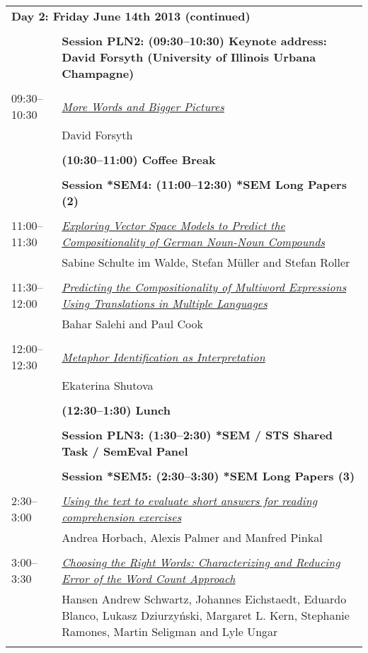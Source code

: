 \begin{tabular}{p{20mm}p{138mm}}
\\
\multicolumn{2}{l}{\bf Day 2: Friday June 14th 2013 (continued)} \\\\
 & {\bf Session PLN2: (09:30--10:30) Keynote address: David Forsyth (University of Illinois Urbana Champagne)} \\
\\
09:30--10:30 & \hyperlink{page.254}{\em More Words and Bigger Pictures}\\
         & David Forsyth \\
\\

 & {\bf (10:30--11:00) Coffee Break} \\
\\
 & {\bf Session *SEM4: (11:00--12:30) *SEM Long Papers (2)} \\
\\
11:00--11:30 & \hyperlink{page.255}{\em Exploring Vector Space Models to Predict the Compositionality of German Noun-Noun Compounds}\\
         & Sabine Schulte im Walde, Stefan M\"{u}ller and Stefan Roller \\
\\

11:30--12:00 & \hyperlink{page.266}{\em Predicting the Compositionality of Multiword Expressions Using Translations in Multiple Languages}\\
         & Bahar Salehi and Paul Cook \\
\\

12:00--12:30 & \hyperlink{page.276}{\em Metaphor Identification as Interpretation}\\
         & Ekaterina Shutova \\
\\

 & {\bf (12:30--1:30) Lunch} \\
\\
 & {\bf Session PLN3: (1:30--2:30) *SEM / STS Shared Task / SemEval Panel} \\
\\
 & {\bf Session *SEM5: (2:30--3:30) *SEM Long Papers (3)} \\
\\
2:30--3:00 & \hyperlink{page.286}{\em Using the text to evaluate short answers for reading comprehension exercises}\\
         & Andrea Horbach, Alexis Palmer and Manfred Pinkal \\
\\

3:00--3:30 & \hyperlink{page.296}{\em Choosing the Right Words: Characterizing and Reducing Error of the Word Count Approach}\\
         & Hansen Andrew Schwartz, Johannes Eichstaedt, Eduardo Blanco, Lukasz Dziurzyński, Margaret L. Kern, Stephanie Ramones, Martin Seligman and Lyle Ungar \\
\\

\end{tabular}
